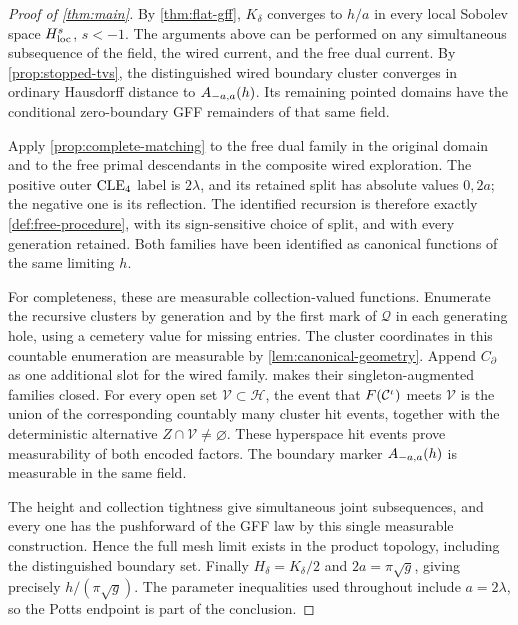 \begin{proof}[Proof of \cref{thm:main}]
By \cref{thm:flat-gff}, $K_\delta$ converges to $h/a$ in every
local Sobolev space $H^s_{\rm loc}$, $s<-1$. The arguments above
can be performed on any simultaneous subsequence of the field,
the wired current, and the free dual current. By
\cref{prop:stopped-tvs}, the distinguished wired boundary
cluster converges in ordinary Hausdorff distance to
$A_{-a,a}(h)$. Its remaining pointed domains have the
conditional zero-boundary GFF remainders of that same field.

Apply \cref{prop:complete-matching} to the free dual family in
the original domain and to the free primal descendants in the
composite wired exploration. The positive outer $\mathrm{CLE}_4$ label is $2\lambda$,
and its retained split has absolute values $0,2a$; the negative
one is its reflection. The identified recursion is therefore
exactly \cref{def:free-procedure}, with its sign-sensitive
choice of split, and with every generation retained. Both
families have been identified as canonical functions of the
same limiting $h$.

For completeness, these are measurable collection-valued functions.
Enumerate the recursive clusters by generation and by the first mark
of \(\mathcal Q\) in each generating hole, using a cemetery value for
missing entries. The cluster coordinates in this countable enumeration
are measurable by \cref{lem:canonical-geometry}.
Append \(C_\partial\) as one additional slot for the wired family.
 makes their singleton-augmented
families closed. For every open set \(\mathcal V\subset\mathscr H\),
the event that \(F(\mathcal C^\iota)\) meets \(\mathcal V\) is the union of
the corresponding countably many cluster hit events, together with
the deterministic alternative \(Z\cap\mathcal V\ne\varnothing\).
These hyperspace hit events prove measurability of both encoded factors.
The boundary marker \(A_{-a,a}(h)\) is measurable in the same field.

The height and collection tightness give simultaneous joint
subsequences, and every one has the pushforward of the GFF law by
this single measurable construction.
Hence the full mesh limit exists in the product topology,
including the distinguished boundary set. Finally
$H_\delta=K_\delta/2$ and $2a=\pi\sqrt g$, giving precisely
$h/(\pi\sqrt g)$. The parameter inequalities used throughout
include $a=2\lambda$, so the Potts endpoint is part of the
conclusion.
\end{proof}
